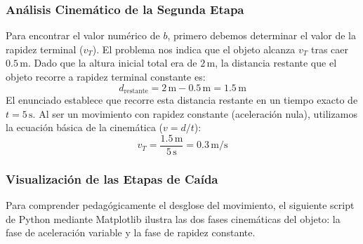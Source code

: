 \documentclass[12pt]{article}
\begin{document}
\subsubsection*{Análisis Cinemático de la Segunda Etapa}
Para encontrar el valor numérico de $b$, primero debemos determinar el valor de la rapidez terminal ($v_T$). El problema nos indica que el objeto alcanza $v_T$ tras caer $0.5 \, \text{m}$. Dado que la altura inicial total era de $2 \, \text{m}$, la distancia restante que el objeto recorre a rapidez terminal constante es:
\begin{equation}
    d_{\text{restante}} = 2 \, \text{m} - 0.5 \, \text{m} = 1.5 \, \text{m}
\end{equation}
El enunciado establece que recorre esta distancia restante en un tiempo exacto de $t = 5 \, \text{s}$. Al ser un movimiento con rapidez constante (aceleración nula), utilizamos la ecuación básica de la cinemática ($v = d/t$):
\begin{equation}
    v_T = \frac{1.5 \, \text{m}}{5 \, \text{s}} = 0.3 \, \text{m/s}
\end{equation}

\subsubsection*{Visualización de las Etapas de Caída}
Para comprender pedagógicamente el desglose del movimiento, el siguiente script de Python mediante Matplotlib ilustra las dos fases cinemáticas del objeto: la fase de aceleración variable y la fase de rapidez constante.
\end{document}
